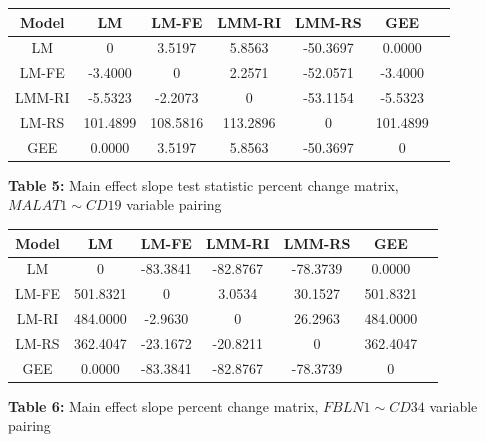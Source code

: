 \documentclass[12pt,]{article}
\begin{document}
\begin{center}
\begin{tabular}{|c||c|c|c|c|c|c|}
\hline
Model & LM & LM-FE & LMM-RI & LMM-RS & GEE \\
\hline
\hline
LM & 0  & 3.5197   & 5.8563    & -50.3697  & 0.0000 \\
\hline
LM-FE & -3.4000  & 0   & 2.2571    & -52.0571  & -3.4000 \\
\hline
LMM-RI & -5.5323  & -2.2073  & 0    & -53.1154  & -5.5323  \\
\hline
LM-RS & 101.4899 & 108.5816 & 113.2896  & 0    & 101.4899 \\
\hline
GEE & 0.0000  & 3.5197   & 5.8563    & -50.3697  & 0 \\
\hline
\end{tabular}

\vspace{5pt}

\textbf{Table 5:} Main effect slope test statistic percent change matrix, $MALAT1 \sim CD19$ variable pairing
\end{center}

\vspace{20pt}

\begin{center}
\begin{tabular}{|c||c|c|c|c|c|c|}
\hline
Model & LM & LM-FE & LMM-RI & LMM-RS & GEE \\
\hline
\hline
LM & 0   & -83.3841 & -82.8767  & -78.3739 & 0.0000  \\
\hline
LM-FE & 501.8321 & 0   & 3.0534    & 30.1527  & 501.8321 \\
\hline
LM-RI & 484.0000 & -2.9630  & 0    & 26.2963  & 484.0000  \\
\hline
LM-RS & 362.4047 & -23.1672 & -20.8211  & 0   & 362.4047  \\
\hline
GEE & 0.0000   & -83.3841 & -82.8767  & -78.3739 & 0  \\
\hline
\end{tabular}

\vspace{5pt}

\textbf{Table 6:} Main effect slope percent change matrix, $FBLN1 \sim CD34$ variable pairing
\end{center}

\vspace{20pt}
\end{document}
